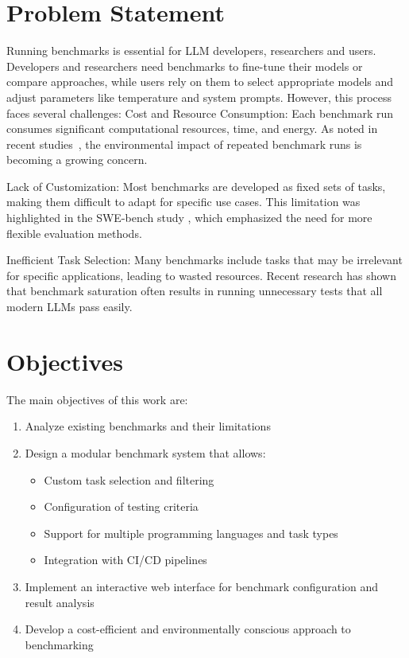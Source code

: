 \section{Problem Statement}

Running benchmarks is essential for LLM developers, researchers and users. Developers and researchers need benchmarks to fine-tune their models or compare approaches, while users rely on them to select appropriate models and adjust parameters like temperature and system prompts. However, this process faces several challenges:
Cost and Resource Consumption: Each benchmark run consumes significant computational resources, time, and energy. As noted in recent studies~\cite{ ????  ?????}, the environmental impact of repeated benchmark runs is becoming a growing concern.

Lack of Customization: Most benchmarks are developed as fixed sets of tasks, making them difficult to adapt for specific use cases. This limitation was highlighted in the SWE-bench study \cite{jimenez2024swebenchlanguagemodelsresolve}, which emphasized the need for more flexible evaluation methods.

Inefficient Task Selection: Many benchmarks include tasks that may be irrelevant for specific applications, leading to wasted resources. Recent research \cite{vendrow2025largelanguagemodelbenchmarks} has shown that benchmark saturation often results in running unnecessary tests that all modern LLMs pass easily.

\section{Objectives}

The main objectives of this work are:
\begin{enumerate}
    \item Analyze existing benchmarks and their limitations
    \item Design a modular benchmark system that allows:
    \begin{itemize}
        \item Custom task selection and filtering
        \item Configuration of testing criteria
        \item Support for multiple programming languages and task types
        \item Integration with CI/CD pipelines
    \end{itemize}
    \item Implement an interactive web interface for benchmark configuration and result analysis
    \item Develop a cost-efficient and environmentally conscious approach to benchmarking
\end{enumerate}

